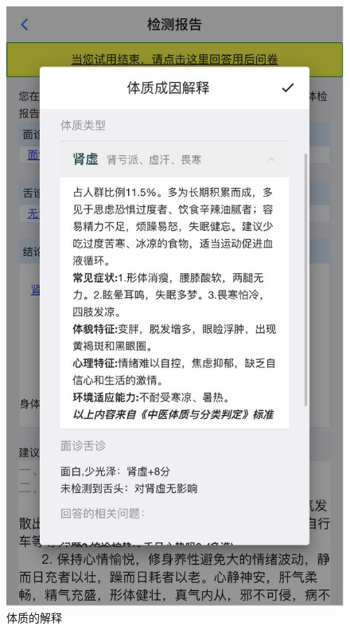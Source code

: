 \begin{figure}
    \centering
    \includegraphics{images/report5.png}
    \caption{体质的解释}
    \label{fig:report_explain_phy_1}
\end{figure}

